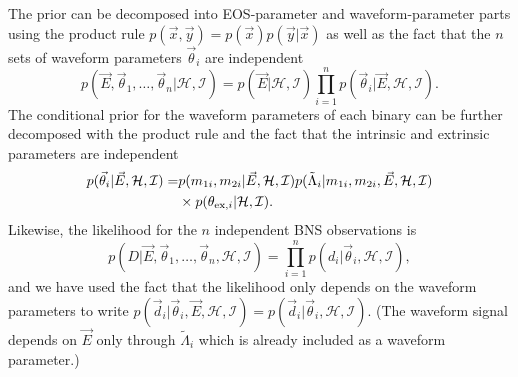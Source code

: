\documentclass[twocolumn,prd,amssymb,aps,nofootinbib,showpacs,epsf]{revtex4}
\begin{document}
The prior can be decomposed into EOS-parameter and waveform-parameter parts using the product rule $p(\vec x, \vec y) = p(\vec x) p(\vec y | \vec x) $ as well as the fact that the $n$ sets of waveform parameters $\vec\theta_i$ are independent
\begin{equation}
p(\vec E,\vec\theta_1,\dots,\vec\theta_n | \mathcal{H},\mathcal{I}) = p(\vec E | \mathcal{H},\mathcal{I}) \prod_{i=1}^n p(\vec\theta_i | \vec E, \mathcal{H},\mathcal{I}).
\end{equation} 
The conditional prior for the waveform parameters of each binary can be further decomposed with the product rule and the fact that the intrinsic and extrinsic parameters are independent
\begin{equation}
\begin{split}
p(\vec\theta_i | \vec E, \mathcal{H},\mathcal{I}) =& p(m_{1i}, m_{2i} | \vec E, \mathcal{H},\mathcal{I}) p(\tilde\Lambda_i | m_{1i}, m_{2i}, \vec E, \mathcal{H},\mathcal{I})\\
&\times p(\theta_{{\rm ex,}i} | \mathcal{H}, \mathcal{I}).
\end{split}
\end{equation}
Likewise, the likelihood for the $n$ independent BNS observations is
\begin{equation}
p(D | \vec E,\vec\theta_1,\dots,\vec\theta_n, \mathcal{H},\mathcal{I}) = \prod_{i=1}^n p(d_i | \vec\theta_i, \mathcal{H},\mathcal{I}),
\end{equation}
and we have used the fact that the likelihood only depends on the waveform parameters to write $p(\vec d_i | \vec\theta_i, \vec E,\mathcal{H},\mathcal{I}) = p(\vec d_i | \vec\theta_i,\mathcal{H},\mathcal{I})$. (The waveform signal depends on $\vec E$ only through $\tilde\Lambda_i$ which is already included as a waveform parameter.)
\end{document}
